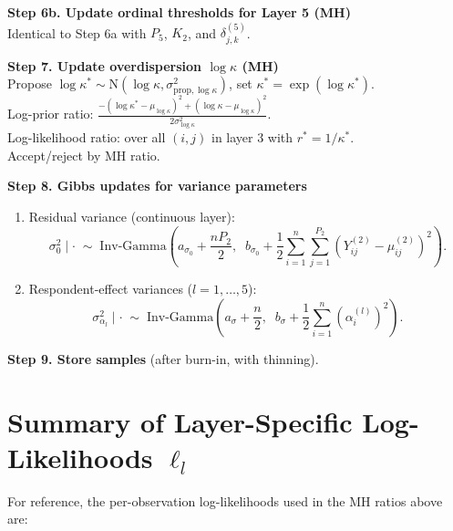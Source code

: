 \documentclass[A4paper,11pt]{article}
\newcommand{\s}{\vspace{.25cm}}
\begin{document}
\begin{algorithm}[H]
{\s
\textbf{Step 6b. Update ordinal thresholds for Layer 5 (MH)} \\
Identical to Step 6a with $P_5$, $K_2$, and $\delta^{(5)}_{j,k}$.

\s
\textbf{Step 7. Update overdispersion $\log\kappa$ (MH)} \\
Propose $\log\kappa^* \sim \mathrm{N}(\log\kappa, \sigma^2_{\mathrm{prop},\log\kappa})$, set $\kappa^* = \exp(\log\kappa^*)$. \\
Log-prior ratio: $\displaystyle \frac{-(\log\kappa^* - \mu_{\log\kappa})^2 + (\log\kappa - \mu_{\log\kappa})^2}{2\sigma^2_{\log\kappa}}$. \\
Log-likelihood ratio: over all $(i,j)$ in layer 3 with $r^* = 1/\kappa^*$. \\
Accept/reject by MH ratio.

\s
\textbf{Step 8. Gibbs updates for variance parameters} \\
\begin{enumerate}
  \item[(a)] Residual variance (continuous layer):
  \[
    \sigma^2_0 \mid \cdot \;\sim\; \mathrm{Inv\text{-}Gamma}\!\left(a_{\sigma_0} + \frac{nP_2}{2},\;\; b_{\sigma_0} + \frac{1}{2}\sum_{i=1}^{n}\sum_{j=1}^{P_2}\left(Y^{(2)}_{ij} - \mu^{(2)}_{ij}\right)^2\right).
  \]
  \item[(b)] Respondent-effect variances ($l=1,\dots,5$):
  \[
    \sigma^2_{\alpha_l} \mid \cdot \;\sim\; \mathrm{Inv\text{-}Gamma}\!\left(a_\sigma + \frac{n}{2},\;\; b_\sigma + \frac{1}{2}\sum_{i=1}^{n}(\alpha^{(l)}_i)^2\right).
  \]
\end{enumerate}

\s
\textbf{Step 9. Store samples} (after burn-in, with thinning).
}
\end{algorithm}

\section{Summary of Layer-Specific Log-Likelihoods $\ell_l$}

For reference, the per-observation log-likelihoods used in the MH ratios above are:
\end{document}
